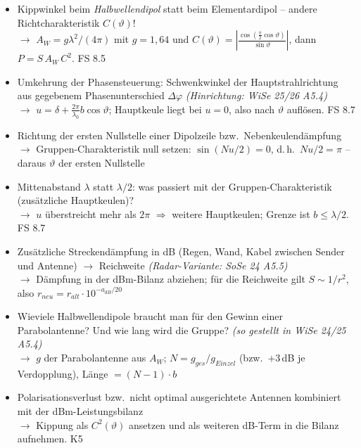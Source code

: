 \documentclass[a4paper,10pt]{article}
\begin{document}
\begin{tcolorbox}[colback=A5Farbe!4, colframe=A5Farbe!55, boxrule=0.5pt, arc=1mm, left=3mm, right=2mm, top=2mm, bottom=2mm, breakable, title={\sffamily\bfseries\small Was diesmal neu drankommen könnte \normalfont\itshape\footnotesize -- eigene Prognose (keine offizielle Ankündigung): Umkehrungen, Kombinationen und Transfers zwischen den Aufgabentypen}, coltitle=white, colbacktitle=A5Farbe!70]
\sffamily\small
\begin{itemize}\setlength{\itemsep}{2.2mm}\setlength{\leftmargini}{4mm}
\item Kippwinkel beim \emph{Halbwellendipol} statt beim Elementardipol -- andere Richtcharakteristik $C(\vartheta)$!\\[0.6mm] {\footnotesize\color{A5Farbe}$\rightarrow$ $A_W=g\lambda^2/(4\pi)$ mit $g=1{,}64$ und $C(\vartheta)=\left|\frac{\cos(\frac{\pi}{2}\cos\vartheta)}{\sin\vartheta}\right|$, dann $P=S\,A_W\,C^2$. FS 8.5}
\item Umkehrung der Phasensteuerung: Schwenkwinkel der Hauptstrahlrichtung aus gegebenem Phasenunterschied $\Delta\varphi$ \textcolor{Grau}{\itshape(Hinrichtung: WiSe 25/26 A5.4)}\\[0.6mm] {\footnotesize\color{A5Farbe}$\rightarrow$ $u=\delta+\frac{2\pi}{\lambda_0}b\cos\vartheta$; Hauptkeule liegt bei $u=0$, also nach $\vartheta$ auflösen. FS 8.7}
\item Richtung der ersten Nullstelle einer Dipolzeile bzw.\ Nebenkeulendämpfung\\[0.6mm] {\footnotesize\color{A5Farbe}$\rightarrow$ Gruppen-Charakteristik null setzen: $\sin(Nu/2)=0$, d.\,h.\ $Nu/2=\pi$ -- daraus $\vartheta$ der ersten Nullstelle}
\item Mittenabstand $\lambda$ statt $\lambda/2$: was passiert mit der Gruppen-Charakteristik (zusätzliche Hauptkeulen)?\\[0.6mm] {\footnotesize\color{A5Farbe}$\rightarrow$ $u$ überstreicht mehr als $2\pi$ $\Rightarrow$ weitere Hauptkeulen; Grenze ist $b\le\lambda/2$. FS 8.7}
\item Zusätzliche Streckendämpfung in dB (Regen, Wand, Kabel zwischen Sender und Antenne) $\rightarrow$ Reichweite \textcolor{Grau}{\itshape(Radar-Variante: SoSe 24 A5.5)}\\[0.6mm] {\footnotesize\color{A5Farbe}$\rightarrow$ Dämpfung in der dBm-Bilanz abziehen; für die Reichweite gilt $S\sim1/r^2$, also $r_{neu}=r_{alt}\cdot10^{-a_{dB}/20}$}
\item Wieviele Halbwellendipole braucht man für den Gewinn einer Parabolantenne? Und wie lang wird die Gruppe? \textcolor{Grau}{\itshape(so gestellt in WiSe 24/25 A5.4)}\\[0.6mm] {\footnotesize\color{A5Farbe}$\rightarrow$ $g$ der Parabolantenne aus $A_W$; $N=g_{ges}/g_{Einzel}$ (bzw.\ $+3$\,dB je Verdopplung), Länge $=(N-1)\cdot b$}
\item Polarisationsverlust bzw.\ nicht optimal ausgerichtete Antennen kombiniert mit der dBm-Leistungsbilanz\\[0.6mm] {\footnotesize\color{A5Farbe}$\rightarrow$ Kippung als $C^2(\vartheta)$ ansetzen und als weiteren dB-Term in die Bilanz aufnehmen. K5}
\end{itemize}\end{tcolorbox}
\end{document}
